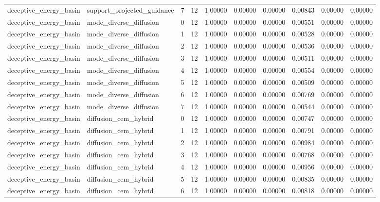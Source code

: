 \documentclass{article}
\begin{document}
\begin{table}[tbp]
{\begin{tabular}{llllllllll}
deceptive\_energy\_basin & support\_projected\_guidance & 7 & 12 & 1.00000 & 0.00000 & 0.00000 & 0.00843 & 0.00000 & 0.00000 \\
deceptive\_energy\_basin & mode\_diverse\_diffusion & 0 & 12 & 1.00000 & 0.00000 & 0.00000 & 0.00551 & 0.00000 & 0.00000 \\
deceptive\_energy\_basin & mode\_diverse\_diffusion & 1 & 12 & 1.00000 & 0.00000 & 0.00000 & 0.00528 & 0.00000 & 0.00000 \\
deceptive\_energy\_basin & mode\_diverse\_diffusion & 2 & 12 & 1.00000 & 0.00000 & 0.00000 & 0.00536 & 0.00000 & 0.00000 \\
deceptive\_energy\_basin & mode\_diverse\_diffusion & 3 & 12 & 1.00000 & 0.00000 & 0.00000 & 0.00511 & 0.00000 & 0.00000 \\
deceptive\_energy\_basin & mode\_diverse\_diffusion & 4 & 12 & 1.00000 & 0.00000 & 0.00000 & 0.00554 & 0.00000 & 0.00000 \\
deceptive\_energy\_basin & mode\_diverse\_diffusion & 5 & 12 & 1.00000 & 0.00000 & 0.00000 & 0.00509 & 0.00000 & 0.00000 \\
deceptive\_energy\_basin & mode\_diverse\_diffusion & 6 & 12 & 1.00000 & 0.00000 & 0.00000 & 0.00769 & 0.00000 & 0.00000 \\
deceptive\_energy\_basin & mode\_diverse\_diffusion & 7 & 12 & 1.00000 & 0.00000 & 0.00000 & 0.00544 & 0.00000 & 0.00000 \\
deceptive\_energy\_basin & diffusion\_cem\_hybrid & 0 & 12 & 1.00000 & 0.00000 & 0.00000 & 0.00747 & 0.00000 & 0.00000 \\
deceptive\_energy\_basin & diffusion\_cem\_hybrid & 1 & 12 & 1.00000 & 0.00000 & 0.00000 & 0.00791 & 0.00000 & 0.00000 \\
deceptive\_energy\_basin & diffusion\_cem\_hybrid & 2 & 12 & 1.00000 & 0.00000 & 0.00000 & 0.00984 & 0.00000 & 0.00000 \\
deceptive\_energy\_basin & diffusion\_cem\_hybrid & 3 & 12 & 1.00000 & 0.00000 & 0.00000 & 0.00768 & 0.00000 & 0.00000 \\
deceptive\_energy\_basin & diffusion\_cem\_hybrid & 4 & 12 & 1.00000 & 0.00000 & 0.00000 & 0.00956 & 0.00000 & 0.00000 \\
deceptive\_energy\_basin & diffusion\_cem\_hybrid & 5 & 12 & 1.00000 & 0.00000 & 0.00000 & 0.00835 & 0.00000 & 0.00000 \\
deceptive\_energy\_basin & diffusion\_cem\_hybrid & 6 & 12 & 1.00000 & 0.00000 & 0.00000 & 0.00818 & 0.00000 & 0.00000 \\

\end{tabular}}
\end{table}
\end{document}
